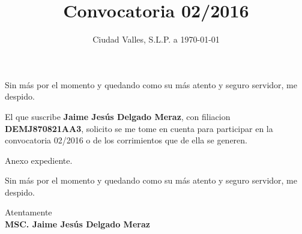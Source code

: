 \documentclass[10pt,letterpaper,sans]{moderncv}
\title{Convocatoria 02/2016}
\begin{document}
\date{Ciudad Valles, S.L.P. a \today}
\opening{}
\closing{Sin más por el momento y quedando como su más atento y seguro servidor, me despido.}
\makelettertitle

El que suscribe \textbf{Jaime Jesús Delgado Meraz}, con filiacion \textbf{DEMJ870821AA3}, solicito se me tome en cuenta para participar en la convocatoria 02/2016 o de los corrimientos que de ella se generen.

Anexo expediente.

Sin más por el momento y quedando como su más atento y seguro servidor, me despido.

\vspace{0.5cm}Atentamente\vspace{1.5cm}\\\textbf{MSC. Jaime Jesús Delgado Meraz}

\end{document}
